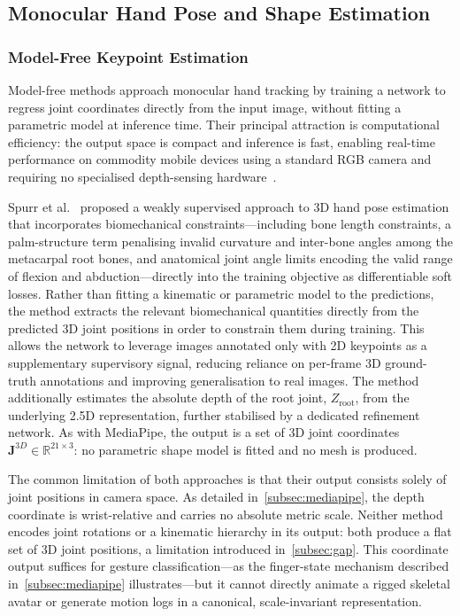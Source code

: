 \subsection{Monocular Hand Pose and Shape Estimation}\label{subsec:sota_estimation}

\subsubsection{Model-Free Keypoint Estimation}\label{subsubsec:model-free}

Model-free methods approach monocular hand tracking by training a network to
regress joint coordinates directly from the input image, without fitting
a parametric model at inference time.
Their principal attraction is computational efficiency: the output space is
compact and inference is fast, enabling real-time performance on commodity
mobile devices using a standard RGB camera and requiring no specialised
depth-sensing hardware~\cite{zhang2020mediapipehands}.

Spurr et al.~\cite{spurr2020weakly} proposed a weakly supervised approach to
3D hand pose estimation that incorporates biomechanical constraints---including
bone length constraints, a palm-structure term penalising invalid curvature and
inter-bone angles among the metacarpal root bones,
and anatomical joint angle limits encoding the valid range
of flexion and abduction---directly into the training objective as
differentiable soft losses.
Rather than fitting a kinematic or parametric model to the predictions, the
method extracts the relevant biomechanical quantities directly from the
predicted 3D joint positions in order to constrain them during training.
This allows the network to leverage images annotated only with 2D keypoints as
a supplementary supervisory signal, reducing reliance on per-frame 3D
ground-truth annotations and improving generalisation to real images.
The method additionally estimates the absolute depth of the root joint,
$Z_\mathrm{root}$, from the underlying 2.5D representation, further stabilised
by a dedicated refinement network.
As with MediaPipe, the output is a set of 3D joint coordinates
$\mathbf{J}^{3D} \in \mathbb{R}^{21\times3}$: no parametric shape model is
fitted and no mesh is produced.

The common limitation of both approaches is that their output consists solely
of joint positions in camera space.
As detailed in~\autoref{subsec:mediapipe}, the depth coordinate is wrist-relative
and carries no absolute metric scale.
Neither method encodes joint rotations or a kinematic hierarchy in its output:
both produce a flat set of 3D joint positions, a limitation introduced
in~\autoref{subsec:gap}.
This coordinate output suffices for gesture classification---as the finger-state
mechanism described in~\autoref{subsec:mediapipe} illustrates---but it cannot
directly animate a rigged skeletal avatar or generate motion logs in a
canonical, scale-invariant representation.



